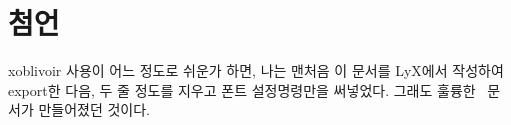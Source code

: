 \documentclass[
	12pt,
	a4paper,
	kosection,
	footnote,
	nobookmarks,
	microtype,
	figtabcapt,
]{oblivoir}
\def\myLabel#1#2{\label{#1}}
\def\myPageREF#1#2{\pageref{#1}}
\def\myLabel#1#2{\label{#2}}
\def\myPageREF#1#2{\pageref{#2}}
\newcommand\xobclass{x\-ob\-liv\-oir\oblivoirallowbreak}
\def\xetexko{\XeTeX-\ko}
\begin{document}
%
%
%
%
%

\section{첨언}
\xobclass{} 사용이 어느 정도로 쉬운가 하면, 나는 맨처음 이 문서를
LyX에서 작성하여 export한 다음, 두 줄 정도를 지우고 폰트
설정명령만을 써넣었다. 그래도 훌륭한 \XeLaTeX\ 문서가 만들어졌던
것이다.
\end{document}
